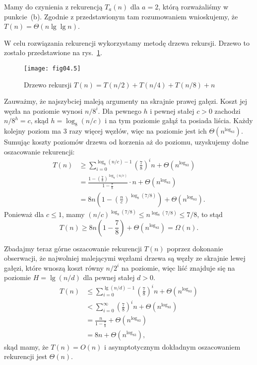 \subproblem %
Mamy do czynienia z rekurencją $T_a(n)$ dla $a=2$, którą rozważaliśmy w punkcie~(b). Zgodnie z przedstawionym tam rozumowaniem wnioskujemy, że $T(n)=\Theta(n\lg\lg n)$.

\subproblem %
W celu rozwiązania rekurencji wykorzystamy metodę drzewa rekursji. Drzewo to zostało przedstawione na rys.~\ref{fig:4-4f}.
\begin{figure}[ht]
	\begin{center}
		\texttt{[image: fig04.5]}
	\end{center}
	\caption{Drzewo rekursji $T(n)=T(n/2)+T(n/4)+T(n/8)+n$} \label{fig:4-4f}
\end{figure}

Zauważmy, że najszybciej maleją argumenty na skrajnie prawej gałęzi. Koszt jej węzła na  poziomie wynosi $n/8^i$. Dla pewnego $h$ i pewnej stałej $c>0$ zachodzi $n/8^h=c$, skąd $h=\log_8(n/c)$ i na tym poziomie gałąź ta posiada liścia. Każdy kolejny poziom ma 3 razy więcej węzłów, więc na  poziomie jest ich $\Theta(n^{\log_83})$. Sumując koszty poziomów drzewa od korzenia aż do  poziomu, uzyskujemy dolne oszacowanie rekurencji:
\begin{align*}
	T(n) &\ge \sum_{i=0}^{\log_8(n/c)-1}\left(\frac{7}{8}\right)^in+\Theta(n^{\log_83}) \\
	&= \frac{1-\left(\frac{7}{8}\right)^{\log_8(n/c)}}{1-\frac{7}{8}}\cdot n+\Theta(n^{\log_83}) \\
	&= 8n\left(1-\left(\frac{n}{c}\right)^{\log_8(7/8)}\right)+\Theta(n^{\log_83}).
\end{align*}
Ponieważ dla $c\le1$, mamy $(n/c)^{\log_8(7/8)} \le n^{\log_8(7/8)} \le 7/8$, to stąd
\[
	T(n) \ge 8n\left(1-\frac{7}{8}\right)+\Theta(n^{\log_83}) = \Omega(n).
\]

Zbadajmy teraz górne oszacowanie rekurencji $T(n)$ poprzez dokonanie obserwacji, że najwolniej malejącymi węzłami drzewa są węzły ze skrajnie lewej gałęzi, które wnoszą koszt równy $n/2^i$ na  poziomie, więc liść znajduje się na poziomie $H=\lg(n/d)$ dla pewnej stałej $d>0$.
\begin{align*}
	T(n) &\le \sum_{i=0}^{\lg(n/d)-1}\left(\frac{7}{8}\right)^in+\Theta(n^{\log_83}) \\
	&< \sum_{i=0}^\infty\left(\frac{7}{8}\right)^in+\Theta(n^{\log_83}) \\
	&= \frac{n}{1-\frac{7}{8}}+\Theta(n^{\log_83}) \\
	&= 8n+\Theta(n^{\log_83}),
\end{align*}
skąd mamy, że $T(n)=O(n)$ i asymptotycznym dokładnym oszacowaniem rekurencji jest $\Theta(n)$.

